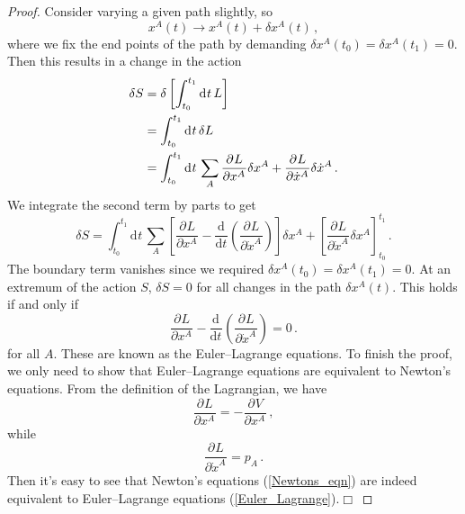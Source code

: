 \documentclass{article}
\theoremstyle{plain}\theoremheaderfont{\normalfont\itshape}\theorembodyfont{\rmfamily}\theoremseparator{.}\newtheorem*{rem}{Remark}\newtheorem*{ex}{Example}\newtheorem*{proof}{Proof}\newtheorem*{altp}{Alternative proof}
\theoremstyle{plain}\theoremheaderfont{\normalfont\bfseries}\theorembodyfont{\rmfamily}\theoremseparator{.}\newtheorem{thm}{Theorem}[section]\newtheorem{lem}[thm]{Lemma}\newtheorem{prop}[thm]{Proposition}\newtheorem*{cor}{Corollary}\newtheorem{defn}[thm]{Definition}\newtheorem{clm}[thm]{Claim}\newtheorem{clminproof}{Claim}\newtheorem*{law}{Law}\newtheorem{pos}[thm]{Postulate}
\theoremstyle{break}\theoremheaderfont{\normalfont\itshape}\theorembodyfont{\rmfamily}\theoremseparator{.\medskip}\newtheorem*{proofskip}{Proof}\newtheorem*{exs}{Examples}\newtheorem*{rems}{Remarks}
\theoremstyle{break}\theoremheaderfont{\normalfont\bfseries}\theorembodyfont{\rmfamily}\theoremseparator{.\medskip}\newtheorem{lemskip}[thm]{Lemma}\newtheorem{defnskip}[thm]{Definition}\newtheorem{propskip}[thm]{Proposition}\newtheorem{thmskip}[thm]{Theorem}
\numberwithin{equation}{section}
\newcommand{\qed}{\hfill\ensuremath{\Box}}
\newcommand{\dd}[2][]{\mathrm{d}^{#1} #2\,}
\newcommand{\dv}[3][]{\frac{\mathrm{d}^{#1} #2}{{\mathrm{d} #3}^{#1}}}
\newcommand{\pdv}[3][]{\frac{\partial^{#1} #2}{{\partial #3}^{#1}}}
\begin{document}
    \begin{proof}
        Consider varying a given path slightly, so
        \begin{equation}
            x^A(t)\longrightarrow x^A(t)+\delta x^A(t)\,,
        \end{equation}
        where we fix the end points of the path by demanding \(\delta x^A(t_0)=\delta x^A(t_1)=0\). Then this results in a change in the action
        \begin{align}
            \delta S&=\delta\left[\int_{t_0}^{t_1}\dd{t}L\right]\notag\\
            &=\int_{t_0}^{t_1}\dd{t}\delta L\notag\\
            &=\int_{t_0}^{t_1}\dd{t}\sum_{A}\pdv{L}{x^A}\delta x^A+\pdv{L}{\dot{x}^A}\delta\dot{x}^A\,.
        \end{align}
        We integrate the second term by parts to get
        \begin{equation}
            \delta S=\int_{t_0}^{t_1}\dd{t}\sum_A\left[\pdv{L}{x^A}-\dv{}{t}\left(\pdv{L}{\dot{x}^A}\right)\right]\delta x^A + \left[\pdv{L}{\dot{x}^A}\delta x^A\right]_{t_0}^{t_1}\,.
        \end{equation}
        The boundary term vanishes since we required \(\delta x^A(t_0)=\delta x^A(t_1)=0\). At an extremum of the action \(S\), \(\delta S=0\) for all changes in the path \(\delta x^A(t)\). This holds if and only if
        \begin{equation}\label{Euler_Lagrange}
            \pdv{L}{x^A}-\dv{}{t}\left(\pdv{L}{\dot{x}^A}\right)=0\,.
        \end{equation}
        for all \(A\). These are known as the Euler--Lagrange equations. To finish the proof, we only need to show that Euler--Lagrange equations are equivalent to Newton's equations. From the definition of the Lagrangian, we have
        \begin{equation}
            \pdv{L}{x^A}=-\pdv{V}{x^A}\,,
        \end{equation}
        while
        \begin{equation}
            \pdv{L}{\dot{x}^A}=p_A\,.
        \end{equation}
        Then it's easy to see that Newton's equations (\ref{Newtons_eqn}) are indeed equivalent to Euler--Lagrange equations (\ref{Euler_Lagrange}).\qed
    \end{proof}
\end{document}
